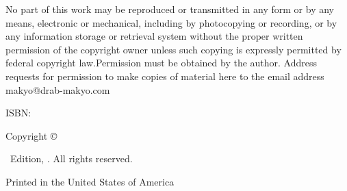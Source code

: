 \singlespacing
\thispagestyle{empty}
\null
\vfill
{\parindent0pt
No part of this work may be reproduced or transmitted in any form or by any means, electronic or mechanical, including by photocopying or recording, or by any information storage or retrieval system without the proper written permission of the copyright owner unless such copying is expressly permitted by federal copyright law.Permission must be obtained by the author. Address requests for permission to make copies of material here to the email address makyo@drab-makyo.com

\vspace{1ex}

ISBN: \ISBN

\vspace{1ex}

\textsc{\FullTitle}

\vspace{1ex}

Copyright \copyright\ \Year

\vspace{1ex}

\Edition\ Edition, \Year. All rights reserved.

\vspace{1ex}

\vspace{1ex}

\vspace{1ex}

Printed in the United States of America\\
\EditionsList
}%

\clearpage

